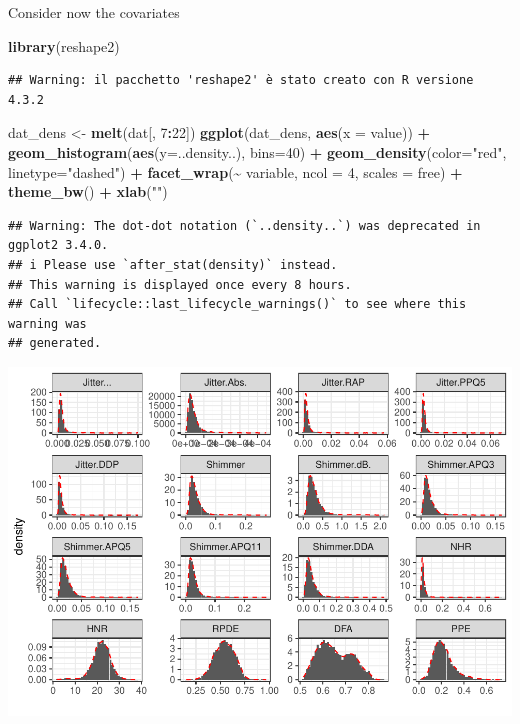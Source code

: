 \documentclass[
]{article}
\newenvironment{Shaded}{\begin{snugshade}}{\end{snugshade}}
\newcommand{\AttributeTok}[1]{\textcolor[rgb]{0.13,0.29,0.53}{#1}}
\newcommand{\DecValTok}[1]{\textcolor[rgb]{0.00,0.00,0.81}{#1}}
\newcommand{\FunctionTok}[1]{\textcolor[rgb]{0.13,0.29,0.53}{\textbf{#1}}}
\newcommand{\NormalTok}[1]{#1}
\newcommand{\OtherTok}[1]{\textcolor[rgb]{0.56,0.35,0.01}{#1}}
\newcommand{\SpecialCharTok}[1]{\textcolor[rgb]{0.81,0.36,0.00}{\textbf{#1}}}
\newcommand{\StringTok}[1]{\textcolor[rgb]{0.31,0.60,0.02}{#1}}
\begin{document}
Consider now the covariates

\begin{Shaded}
\begin{Highlighting}[]
\FunctionTok{library}\NormalTok{(reshape2)}
\end{Highlighting}
\end{Shaded}

\begin{verbatim}
## Warning: il pacchetto 'reshape2' è stato creato con R versione 4.3.2
\end{verbatim}

\begin{Shaded}
\begin{Highlighting}[]
\NormalTok{dat\_dens }\OtherTok{\textless{}{-}} \FunctionTok{melt}\NormalTok{(dat[, }\DecValTok{7}\SpecialCharTok{:}\DecValTok{22}\NormalTok{])}
\FunctionTok{ggplot}\NormalTok{(dat\_dens, }\FunctionTok{aes}\NormalTok{(}\AttributeTok{x =}\NormalTok{ value)) }\SpecialCharTok{+} 
  \FunctionTok{geom\_histogram}\NormalTok{(}\FunctionTok{aes}\NormalTok{(}\AttributeTok{y=}\NormalTok{..density..), }\AttributeTok{bins=}\DecValTok{40}\NormalTok{) }\SpecialCharTok{+}
  \FunctionTok{geom\_density}\NormalTok{(}\AttributeTok{color=}\StringTok{"red"}\NormalTok{, }\AttributeTok{linetype=}\StringTok{"dashed"}\NormalTok{) }\SpecialCharTok{+}
  \FunctionTok{facet\_wrap}\NormalTok{(}\SpecialCharTok{\textasciitilde{}}\NormalTok{ variable, }\AttributeTok{ncol =} \DecValTok{4}\NormalTok{, }\AttributeTok{scales =} \StringTok{\textquotesingle{}free\textquotesingle{}}\NormalTok{) }\SpecialCharTok{+}
  \FunctionTok{theme\_bw}\NormalTok{() }\SpecialCharTok{+}
  \FunctionTok{xlab}\NormalTok{(}\StringTok{""}\NormalTok{)}
\end{Highlighting}
\end{Shaded}

\begin{verbatim}
## Warning: The dot-dot notation (`..density..`) was deprecated in ggplot2 3.4.0.
## i Please use `after_stat(density)` instead.
## This warning is displayed once every 8 hours.
## Call `lifecycle::last_lifecycle_warnings()` to see where this warning was
## generated.
\end{verbatim}

\includegraphics{Data_Exploration_files/figure-latex/unnamed-chunk-14-1.pdf}
\end{document}
